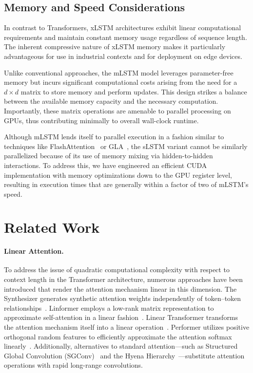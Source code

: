\subsection{Memory and Speed Considerations}

In contrast to Transformers, xLSTM architectures exhibit linear computational requirements and maintain constant memory usage regardless of sequence length. The inherent compressive nature of xLSTM memory makes it particularly advantageous for use in industrial contexts and for deployment on edge devices.

Unlike conventional approaches, the mLSTM model leverages parameter-free memory but incurs significant computational costs arising from the need for a $d \times d$ matrix to store memory and perform updates. This design strikes a balance between the available memory capacity and the necessary computation. Importantly, these matrix operations are amenable to parallel processing on GPUs, thus contributing minimally to overall wall-clock runtime.

Although mLSTM lends itself to parallel execution in a fashion similar to techniques like FlashAttention~\citep{Dao:22,Dao:23} or GLA~\citep{Yang:23arxiv}, the sLSTM variant cannot be similarly parallelized because of its use of memory mixing via hidden-to-hidden interactions. To address this, we have engineered an efficient CUDA implementation with memory optimizations down to the GPU register level, resulting in execution times that are generally within a factor of two of mLSTM’s speed.

\section{Related Work}
\label{sec:related}

\paragraph{Linear Attention.} To address the issue of quadratic computational complexity with respect to context length in the Transformer architecture, numerous approaches have been introduced that render the attention mechanism linear in this dimension. The Synthesizer generates synthetic attention weights independently of token--token relationships~\citep{Tay:20arxiv}. Linformer employs a low-rank matrix representation to approximate self-attention in a linear fashion~\citep{Wang:20arxiv}. Linear Transformer transforms the attention mechanism itself into a linear operation~\citep{Katharopoulos:20}. Performer utilizes positive orthogonal random features to efficiently approximate the attention softmax linearly~\citep{Choromanski:21}. Additionally, alternatives to standard attention—such as Structured Global Convolution (SGConv)~\citep{Li:22} and the Hyena Hierarchy~\citep{Poli:23}—substitute attention operations with rapid long-range convolutions.

